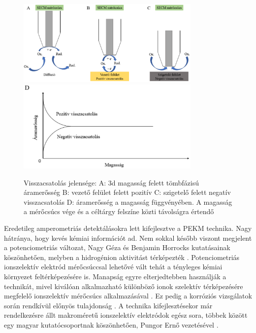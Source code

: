 \begin{figure}
\centering
\includegraphics[width=0.8\textwidth]{img/feedback.eps}
\includegraphics[width=0.8\textwidth]{img/feedback2.eps}
\caption{Visszacsatolás jelensége:
A: 3d magasság felett tömbfázisú áramerősség
B: vezető felület felett pozitív
C: szigetelő felett negatív visszacsatolás
D: áramerősség a magasság függvényében. A magasság a mérőcsúcs vége és a céltárgy felszíne közti távolságra értendő}
\label{fig:feedback}
\end{figure}

Eredetileg amperometriás detektálásokra lett kifejlesztve a PEKM technika. Nagy hátránya, hogy kevés kémiai információt ad. Nem sokkal később viszont megjelent a potenciometriás változat, Nagy Géza és Benjamin Horrocks kutatásainak köszönhetően, melyben a hidrogénion aktivitást térképezték \cite{horrocks1993scanning}. Potenciometriás ionszelektív elektród mérőcsúccsal lehetővé vált tehát a tényleges kémiai környezet feltérképezésére is. Manapság egyre elterjedtebben használják a technikát, mivel kiválóan alkalmazható különböző ionok szelektív térképezésére megfelelő ionszelektív mérőcsúcs alkalmazásával \cite{izquierdo2011spatially}. Ez pedig a korróziós vizsgálatok során rendkívül előnyös tulajdonság \cite{souto2013spatially}. A technika kifejlesztésekor már rendelkezésre állt makroméretű ionszelektív elektródok egész sora, többek között egy magyar kutatócsoportnak köszönhetően, Pungor Ernő vezetésével \cite{pungor1978ion,pungor1998theory}.

